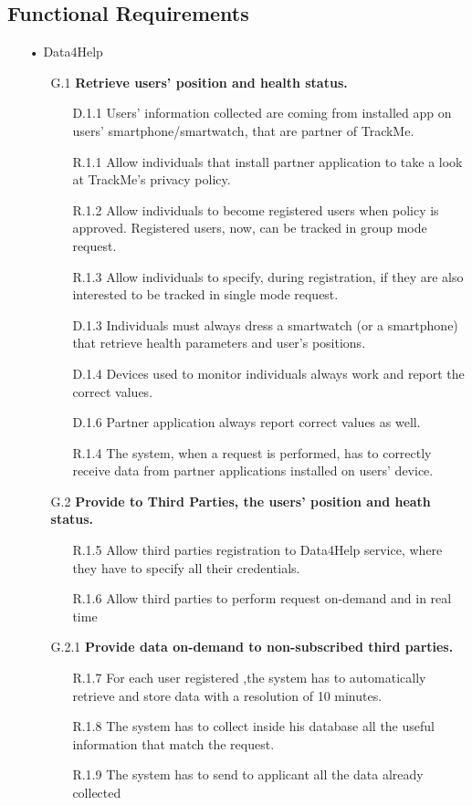 \subsection{Functional Requirements}
\begin{enumerate}
\item[•]{\Large Data4Help}
	\begin{enumerate}
	\item [G.1] \textbf{Retrieve users' position and health status.}
		\begin{enumerate}
		\item [D.1.1] Users' information collected are coming from installed app on users' smartphone/smartwatch, that are partner of TrackMe.
		\item [R.1.1] Allow individuals that install partner application to take a look at TrackMe's privacy policy.
		\item [R.1.2] Allow individuals to become registered users when policy is approved. Registered users, now, can be tracked in group mode request.  
		\item [R.1.3] Allow individuals to specify, during registration, if they are also interested to be tracked in single mode request. 
		\item [D.1.3] Individuals must always dress a smartwatch (or a smartphone) that retrieve health parameters and user's positions.  
		\item [D.1.4] Devices used to monitor individuals always work and report 			the correct values.	
    	\item [D.1.6] Partner application always report correct values as well.
    	\item [R.1.4] The system, when a request is performed, has to correctly receive data from partner applications installed on users' device.
    	\end{enumerate}	
    	
    \item [G.2] \textbf{Provide to Third Parties, the users' position and heath status.}
    	\begin{enumerate} 
    	\item [R.1.5] Allow third parties registration to Data4Help service, where they have to specify all their credentials.
    	\item [R.1.6] Allow third parties to perform request on-demand and in real time
    	\end{enumerate}	
		
	\item [G.2.1] \textbf{Provide data on-demand to non-subscribed third parties.}
		\begin{enumerate} 
		\item [R.1.7] For each user registered ,the system has to automatically retrieve and store data with a resolution of 10 minutes.	
		\item [R.1.8] The system has to collect inside his database all the useful information that match the request.
		\item [R.1.9] The system has to send to applicant all the data already collected
    	\end{enumerate}	
    	

\end{enumerate}
\end{enumerate}
